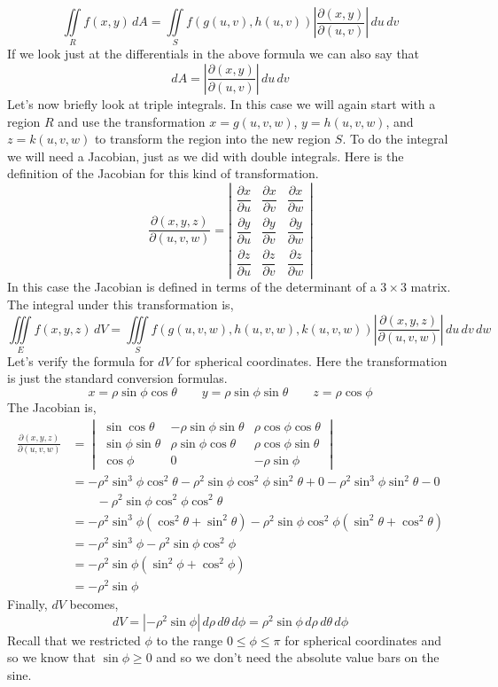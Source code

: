 \documentclass[10pt,reqno]{book}
\theoremstyle{definition}
\begin{document}
	 \[ \iint\limits_R f(x,y)\,dA = \iint\limits_S f(g(u,v),h(u,v)) \left| \frac{\partial (x,y)}{\partial (u,v)} \right| \,du\,dv \]
	 If we look just at the differentials in the above formula we can also say that
	 \[ dA = \left| \frac{\partial (x,y)}{\partial (u,v)} \right| \,du\,dv \]
	 Let's now briefly look at triple integrals. In this case we will again start with a region $ R $ and use the transformation $ x = g(u,v,w) $, $ y = h(u,v,w) $, and $ z = k(u,v,w) $ to transform the region into the new region $ S $. To do the integral we will need a Jacobian, just as we did with double integrals. Here is the definition of the Jacobian for this kind of transformation.
	 \[ \frac{\partial (x,y,z)}{\partial (u,v,w)} = 
	 		\left|
	 			\begin{array}{ccc}
	 				\dfrac{\partial x}{\partial u} & \dfrac{\partial x}{\partial v} & \dfrac{\partial x}{\partial w}\\[8pt]
	 				\dfrac{\partial y}{\partial u} & \dfrac{\partial y}{\partial v} & \dfrac{\partial y}{\partial w}\\[8pt]
	 				\dfrac{\partial z}{\partial u} & \dfrac{\partial z}{\partial v} & \dfrac{\partial z}{\partial w}
	 			\end{array}
	 		\right|
	\]
	In this case the Jacobian is defined in terms of the determinant of a $ 3 \times 3 $ matrix. The integral under this transformation is,
	\[ \iiint\limits_E f(x,y,z)\,dV = \iiint\limits_S f(g(u,v,w),h(u,v,w),k(u,v,w)) \left| \frac{\partial (x,y,z)}{\partial (u,v,w)} \right|\,du\,dv\,dw \]
	Let's verify the formula for $ dV $ for spherical coordinates. Here the transformation is just the standard conversion formulas.
	\[ x = \rho\sin\phi\cos\theta \qquad y = \rho\sin\phi\sin\theta \qquad z = \rho\cos\phi \]
	The Jacobian is,
	\begin{align*}
	  	\frac{\partial (x,y,z)}{\partial (u,v,w)} &= 
	  		\begin{vmatrix}
	  			\sin\cos\theta & -\rho\sin\phi\sin\theta & \rho\cos\phi\cos\theta\\
	  			\sin\phi\sin\theta & \rho\sin\phi\cos\theta & \rho\cos\phi\sin\theta\\
	  			\cos\phi & 0 & -\rho\sin\phi
	  		\end{vmatrix}\\
	  		&= -\rho^2 \sin^3\phi \cos^2\theta -\rho^2\sin\phi\cos^2\phi\sin^2\theta + 0 - \rho^2\sin^3\phi \sin^2\theta - 0\\
	  		&\qquad - \rho^2\sin\phi \cos^2\phi \cos^2\theta\\
	  		&= -\rho^2 \sin^3\phi (\cos^2\theta + \sin^2\theta) -\rho^2\sin\phi \cos^2\phi(\sin^2\theta + \cos^2\theta)\\
	  		&= -\rho^2\sin^3\phi - \rho^2\sin\phi \cos^2\phi\\
	  		&= -\rho^2\sin\phi(\sin^2\phi + \cos^2\phi)\\
	  		&= -\rho^2\sin\phi
	\end{align*}
	Finally, $ dV $ becomes,
	\[ dV = |-\rho^2\sin\phi|\,d\rho\,d\theta\,d\phi = \rho^2\sin\phi\,d\rho\,d\theta\,d\phi \]
	Recall that we restricted $ \phi $ to the range $ 0 \leq \phi \leq \pi $ for spherical coordinates and so we know that $ \sin\phi \geq 0 $ and so we don't need the absolute value bars on the sine.
	
\end{document}
